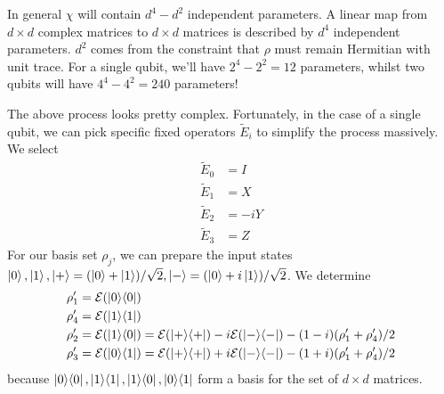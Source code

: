 In general $\chi$ will contain $d^4 - d^2$ independent parameters. A linear map from $d \times d$
complex matrices to $d \times d$ matrices is described by $d^4$ independent parameters. $d^2$ comes
from the constraint that $\rho$ must remain Hermitian with unit trace. For a single qubit, we'll
have $2^4 - 2^2 = 12$ parameters, whilst two qubits will have $4^4 - 4^2 = 240$ parameters!  

The above process looks pretty complex. Fortunately, in the case of a single qubit, we can pick
specific fixed operators $\tilde{E}_i$ to simplify the process massively. We select
\begin{align}
    \tilde{E}_0 &= I \\
    \tilde{E}_1 &= X \\
    \tilde{E}_2 &= -iY \\
    \tilde{E}_3 &= Z
\end{align}
For our basis set $\rho_j$, we can prepare the input states $\ket{0}, \ket{1}, \ket{+} = (\ket{0} +
\ket{1}) / \sqrt{2}, \ket{-}= (\ket{0} + i\ket{1}) / \sqrt{2}$. We determine
\begin{align}
    \rho_1' &= \mathcal{E}(\ketbra{0}{0}) \\
    \rho_4' &= \mathcal{E}(\ketbra{1}{1}) \\
    \rho_2' &= \mathcal{E}(\ketbra{1}{0}) = \mathcal{E}(\ketbra{+}{+}) - i\mathcal{E}(\ketbra{-}{-}) - (1 - i)(\rho_1' + \rho_4') / 2 \\
    \rho_3' &= \mathcal{E}(\ketbra{0}{1}) = \mathcal{E}(\ketbra{+}{+}) + i\mathcal{E}(\ketbra{-}{-}) - (1 + i)(\rho_1' + \rho_4') / 2
\end{align}
because $\ket{0}\!\bra{0}, \ket{1}\!\bra{1}, \ket{1}\!\bra{0}, \ket{0}\!\bra{1}$ form a basis for the set of $d
\times d$ matrices.